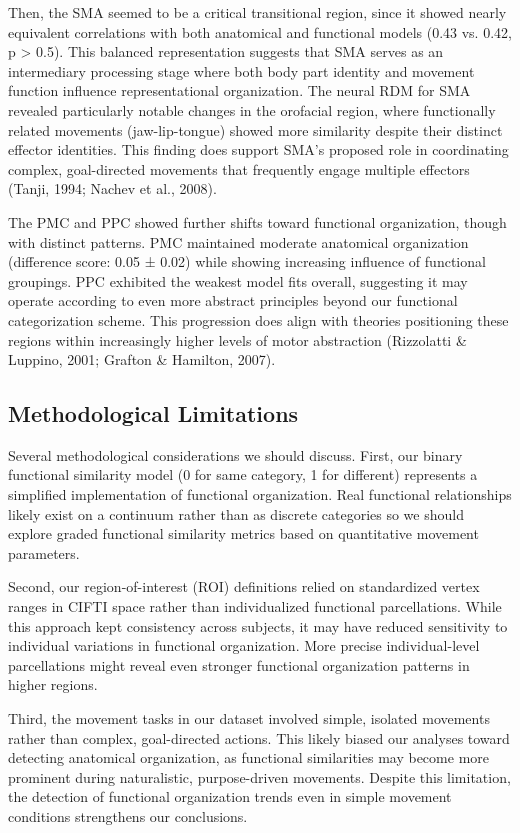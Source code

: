 \documentclass{article}
\begin{document}
Then, the SMA seemed to be a critical transitional region, since it showed nearly equivalent correlations with both anatomical and functional models (0.43 vs. 0.42, p > 0.5). This balanced representation suggests that SMA serves as an intermediary processing stage where both body part identity and movement function influence representational organization. The neural RDM for SMA revealed particularly notable changes in the orofacial region, where functionally related movements (jaw-lip-tongue) showed more similarity despite their distinct effector identities. This finding does support SMA's proposed role in coordinating complex, goal-directed movements that frequently engage multiple effectors (Tanji, 1994; Nachev et al., 2008).

The PMC and PPC showed further shifts toward functional organization, though with distinct patterns. PMC maintained moderate anatomical organization (difference score: 0.05 ± 0.02) while showing increasing influence of functional groupings. PPC exhibited the weakest model fits overall, suggesting it may operate according to even more abstract principles beyond our functional categorization scheme. This progression does align with theories positioning these regions within increasingly higher levels of motor abstraction (Rizzolatti \& Luppino, 2001; Grafton \& Hamilton, 2007).

\subsection{Methodological Limitations}

Several methodological considerations we should discuss. First, our binary functional similarity model (0 for same category, 1 for different) represents a simplified implementation of functional organization. Real functional relationships likely exist on a continuum rather than as discrete categories so we should explore graded functional similarity metrics based on quantitative movement parameters.

Second, our region-of-interest (ROI) definitions relied on standardized vertex ranges in CIFTI space rather than individualized functional parcellations. While this approach kept consistency across subjects, it may have reduced sensitivity to individual variations in functional organization. More precise individual-level parcellations might reveal even stronger functional organization patterns in higher regions.

Third, the movement tasks in our dataset involved simple, isolated movements rather than complex, goal-directed actions. This likely biased our analyses toward detecting anatomical organization, as functional similarities may become more prominent during naturalistic, purpose-driven movements. Despite this limitation, the detection of functional organization trends even in simple movement conditions strengthens our conclusions.
\end{document}
